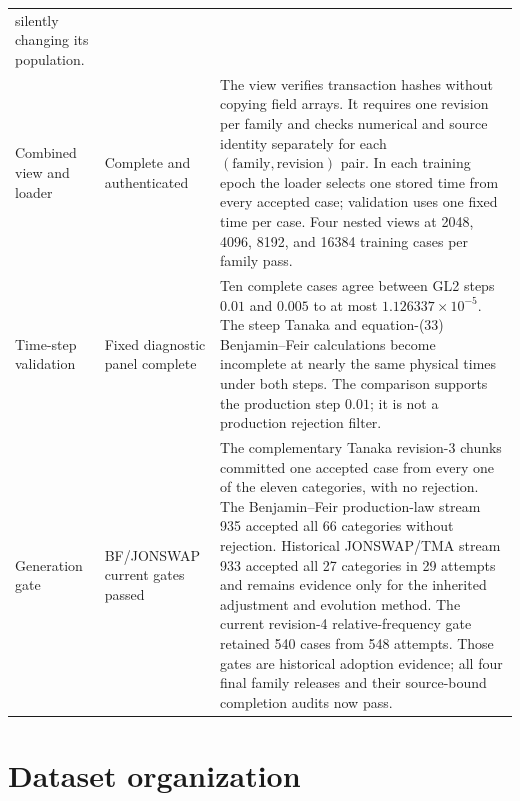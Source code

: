 \documentclass[11pt]{article}
\begin{document}
\begin{center}
\begin{tabularx}{\textwidth}{
  @{}>{\raggedright\arraybackslash}p{}
     >{\raggedright\arraybackslash}p{}
     >{\raggedright\arraybackslash}X@{}}
      silently changing its population. \\
  Combined view and loader
    & Complete and authenticated
    & The view verifies transaction hashes without copying field arrays.
      It requires one revision per family and checks numerical and source
      identity separately for each $(\text{family},\text{revision})$ pair.
      In each training epoch the loader selects one stored time from every
      accepted case; validation uses one fixed time per case.  Four nested
      views at 2048, 4096, 8192, and 16384 training cases per family pass. \\
  Time-step validation
    & Fixed diagnostic panel complete
    & Ten complete cases agree between GL2 steps $0.01$ and $0.005$ to at
      most $1.126337\times10^{-5}$.  The steep Tanaka and equation-(33)
      Benjamin--Feir calculations become incomplete at nearly the same
      physical times under both steps.  The comparison supports the
      production step $0.01$; it is not a production rejection filter. \\
  Generation gate
    & BF/JONSWAP current gates passed
    & The complementary Tanaka revision-3 chunks committed one accepted case
      from every one of the eleven categories, with no rejection.  The
      Benjamin--Feir production-law stream 935 accepted all 66 categories
      without rejection.  Historical JONSWAP/TMA stream 933 accepted all 27
      categories in 29 attempts and remains evidence only for the inherited
      adjustment and evolution method.  The current revision-4
      relative-frequency gate retained 540 cases from 548 attempts.  Those
      gates are historical adoption evidence; all four final family releases
      and their source-bound completion audits now pass. \\
  \bottomrule
\end{tabularx}
\end{center}

\section{Dataset organization}
\label{sec:dataset-design}
\end{document}
